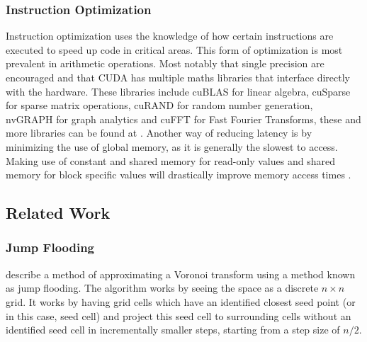 \subsubsection{Instruction Optimization}
Instruction optimization uses the knowledge of how certain instructions are executed to speed up code in critical areas. This form of optimization is most prevalent in arithmetic operations. Most notably that single precision are encouraged and that CUDA has multiple maths libraries that interface directly with the hardware. These libraries include cuBLAS for linear algebra, cuSparse for sparse matrix operations, cuRAND for random number generation, nvGRAPH for graph analytics and cuFFT for Fast Fourier Transforms, these and more libraries can be found at \citet{CUDA_lib}. Another way of reducing latency is by minimizing the use of global memory, as it is generally the slowest to access. Making use of constant and shared memory for read-only values and shared memory for block specific values will drastically improve memory access times \citep{CUDA}.
\subsection{Related Work}\label{gpu:sec:rel}
\subsubsection{Jump Flooding}
\citet{rong2006jump} describe a method of approximating a Voronoi transform using a method known as jump flooding. The algorithm works by seeing the space as a discrete $n \times n$ grid. It works by having grid cells which have an identified closest seed point (or in this case, seed cell) and project this seed cell to surrounding cells without an identified seed cell in incrementally smaller steps, starting from a step size of $n/2$.
